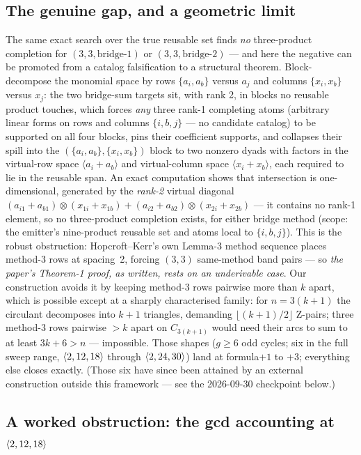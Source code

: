\subsection{The genuine gap, and a geometric limit}

The same exact search over the true reusable set finds \emph{no}
three-product completion for \((3,3,\mathrm{bridge}\text{-}1)\) or
\((3,3,\mathrm{bridge}\text{-}2)\) — and here the negative can be promoted
from a catalog falsification to a structural theorem. Block-decompose the
monomial space by rows \(\{a_i,a_b\}\) versus \(a_j\) and columns
\(\{x_i,x_b\}\) versus \(x_j\): the two bridge-sum targets sit, with rank 2,
in blocks no reusable product touches, which forces \emph{any} three rank-1
completing atoms (arbitrary linear forms on rows and columns \(\{i,b,j\}\) —
no candidate catalog) to be supported on all four blocks, pins their
coefficient supports, and collapses their spill into the
\((\{a_i,a_b\},\{x_i,x_b\})\) block to two nonzero dyads with factors in the
virtual-row space \(\langle a_i{+}a_b\rangle\) and virtual-column space
\(\langle x_i{+}x_b\rangle\), each required to lie in the reusable span. An
exact computation shows that intersection is one-dimensional, generated by
the \emph{rank-2} virtual diagonal
\((a_{i1}{+}a_{b1})\otimes(x_{1i}{+}x_{1b}) +
(a_{i2}{+}a_{b2})\otimes(x_{2i}{+}x_{2b})\) — it contains no rank-1 element,
so no three-product completion exists, for either bridge method
(scope: the emitter's nine-product reusable set and atoms local to
\(\{i,b,j\}\)). This is the robust obstruction:
Hopcroft--Kerr's own Lemma-3 method sequence places method-3 rows at
spacing~2, forcing \((3,3)\) same-method band pairs — so \emph{the paper's
Theorem-1 proof, as written, rests on an underivable case}. Our construction
avoids it by keeping method-3 rows pairwise more than \(k\) apart, which is
possible except at a sharply characterised family: for \(n = 3(k{+}1)\) the
circulant decomposes into \(k{+}1\) triangles, demanding
\(\lfloor (k{+}1)/2 \rfloor\) Z-pairs; three method-3 rows pairwise
\({>}k\) apart on \(C_{3(k+1)}\) would need their arcs to sum to at least
\(3k{+}6 > n\) — impossible. Those shapes (\(g \ge 6\) odd cycles; six in
the full sweep range, \(\langle 2, 12, 18 \rangle\) through
\(\langle 2, 24, 30 \rangle\)) land at formula\(+1\) to \(+3\); everything else
closes exactly. (Those six have since been attained by an external
construction outside this framework — see the 2026-09-30 checkpoint
below.)

\subsection{A worked obstruction: the gcd accounting at
\(\langle 2, 12, 18 \rangle\)}
\label{ssec:hk71-gcd}

